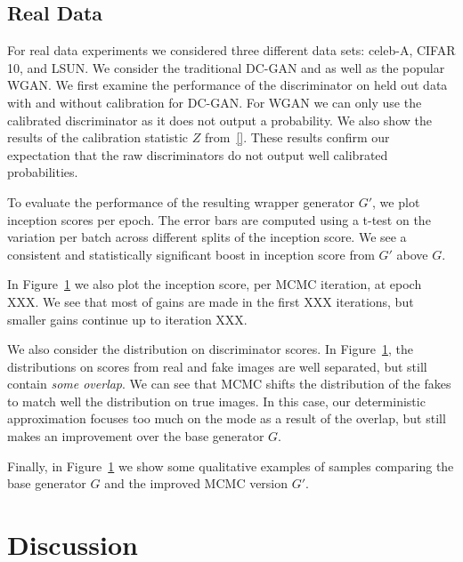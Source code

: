 \documentclass{article}
\begin{document}
\subsection{Real Data}
For real data experiments we considered three different data sets: celeb-A, CIFAR 10, and LSUN\@.
We consider the traditional DC-GAN and as well as the popular WGAN\@.  %
We first examine the performance of the discriminator on held out data with and without calibration for DC-GAN\@.
For WGAN we can only use the calibrated discriminator as it does not output a probability.
We also show the results of the calibration statistic $Z$ from~\eqref{}.
These results confirm our expectation that the raw discriminators do not output well calibrated probabilities.

To evaluate the performance of the resulting wrapper generator $G'$, we plot inception scores per epoch.
The error bars are computed using a t-test on the variation per batch across different splits of the inception score.
We see a consistent and statistically significant boost in inception score from $G'$ above $G$.

In Figure~\ref{} we also plot the inception score, per MCMC iteration, at epoch XXX.  %
We see that most of gains are made in the first XXX iterations, but smaller gains continue up to iteration XXX.  %

We also consider the distribution on discriminator scores.
In Figure~\ref{}, the distributions on scores from real and fake images are well separated, but still contain \emph{some overlap}.
We can see that MCMC shifts the distribution of the fakes to match well the distribution on true images.
In this case, our deterministic approximation focuses too much on the mode as a result of the overlap, but still makes an improvement over the base generator $G$.

Finally, in Figure~\ref{} we show some qualitative examples of samples comparing the base generator $G$ and the improved MCMC version $G'$.

\section{Discussion}
\end{document}
